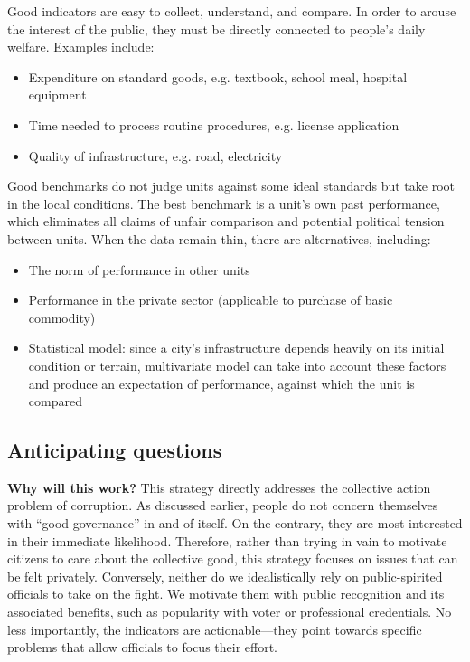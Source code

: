 \documentclass[12pt]{article}
\begin{document}
Good indicators are easy to collect, understand, and compare. In order to arouse the interest of the public, they must be directly connected to people's daily welfare. Examples include:
\begin{itemize}[noitemsep]
\item{Expenditure on standard goods, e.g. textbook, school meal, hospital equipment}
\item{Time needed to process routine procedures, e.g. license application}
\item{Quality of infrastructure, e.g. road, electricity}
\end{itemize}

Good benchmarks do not judge units against some ideal standards but take root in the local conditions. The best benchmark is a unit's own past performance, which eliminates all claims of unfair comparison and potential political tension between units. When the data remain thin, there are alternatives, including:
\begin{itemize}[noitemsep]
\item{The norm of performance in other units}
\item{Performance in the private sector (applicable to purchase of basic commodity)}
\item{Statistical model: since a city's infrastructure depends heavily on its initial condition or terrain, multivariate model can take into account these factors and produce an expectation of performance, against which the unit is compared}
\end{itemize}

\subsection{Anticipating questions} \label{sec:potentialproblem}

\textbf{Why will this work?} This strategy directly addresses the collective action problem of corruption. As discussed earlier, people do not concern themselves with ``good governance'' in and of itself. On the contrary, they are most interested in their immediate likelihood. Therefore, rather than trying in vain to motivate citizens to care about the collective good, this strategy focuses on issues that can be felt privately. Conversely, neither do we idealistically rely on public-spirited officials to take on the fight. We motivate them with public recognition and its associated benefits, such as popularity with voter or professional credentials. No less importantly, the indicators are actionable---they point towards specific problems that allow officials to focus their effort.
\end{document}
